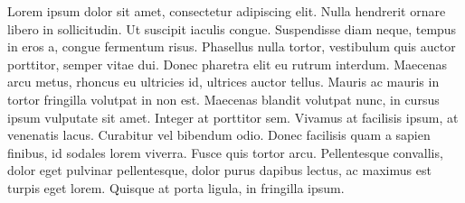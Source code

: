 Lorem ipsum dolor sit amet, consectetur adipiscing elit. Nulla hendrerit ornare libero in sollicitudin. Ut suscipit iaculis congue. Suspendisse diam neque, tempus in eros a, congue fermentum risus. Phasellus nulla tortor, vestibulum quis auctor porttitor, semper vitae dui. Donec pharetra elit eu rutrum interdum. Maecenas arcu metus, rhoncus eu ultricies id, ultrices auctor tellus. Mauris ac mauris in tortor fringilla volutpat in non est. Maecenas blandit volutpat nunc, in cursus ipsum vulputate sit amet. Integer at porttitor sem. Vivamus at facilisis ipsum, at venenatis lacus. Curabitur vel bibendum odio. Donec facilisis quam a sapien finibus, id sodales lorem viverra. Fusce quis tortor arcu. Pellentesque convallis, dolor eget pulvinar pellentesque, dolor purus dapibus lectus, ac maximus est turpis eget lorem. Quisque at porta ligula, in fringilla ipsum.
